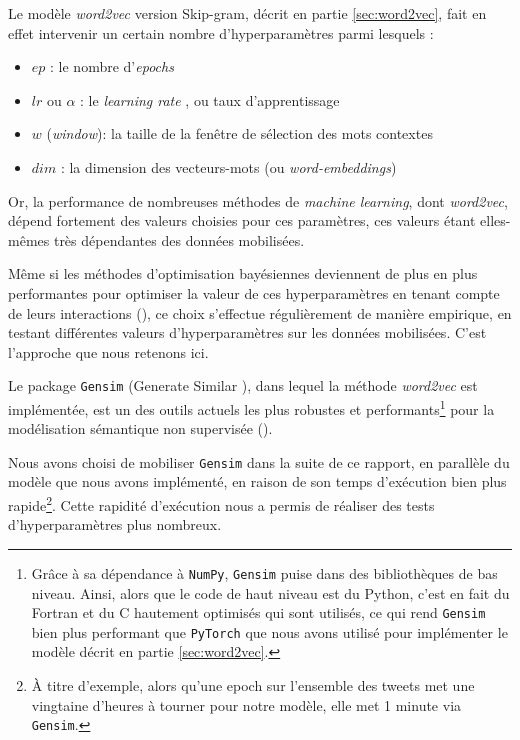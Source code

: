 \documentclass[11pt,french,french]{article}
\let\rmarkdownfootnote\footnote%
\def\footnote{\protect\rmarkdownfootnote}
\begin{document}
Le modèle \emph{word2vec} version Skip-gram, décrit en partie \ref{sec:word2vec}, fait en effet intervenir un certain nombre d'hyperparamètres parmi lesquels :

\begin{itemize}
\item $ep$ : le nombre d'\og \emph{epochs} \fg{}
\item $lr$ ou $\alpha$ : le \og \emph{learning rate} \fg{}, ou taux d'apprentissage
\item $w$ (\emph{window}): la taille de la fenêtre de sélection des mots contextes
\item $dim$ : la dimension des vecteurs-mots (ou \emph{word-embeddings})
\end{itemize}

Or, la performance de nombreuses méthodes de \emph{machine learning}, dont \emph{word2vec}, dépend fortement des valeurs choisies pour ces paramètres, ces valeurs étant elles-mêmes très dépendantes des données mobilisées.

Même si les méthodes d'optimisation bayésiennes deviennent de plus en plus performantes pour optimiser la valeur de ces hyperparamètres en tenant compte de leurs interactions (\cite{Hutter}), ce choix s'effectue régulièrement de manière empirique, en testant différentes valeurs d'hyperparamètres sur les données mobilisées.
C'est l'approche que nous retenons ici.

Le package \texttt{Gensim} (\og Generate Similar \fg{}), dans lequel la méthode \emph{word2vec} est implémentée, est un des outils actuels les plus robustes et performants\footnote{Grâce à sa dépendance à \texttt{NumPy}, \texttt{Gensim} puise dans des bibliothèques de bas niveau.
  Ainsi, alors que le code de haut niveau est du Python, c'est en fait du Fortran et du C hautement optimisés qui sont utilisés, ce qui rend \texttt{Gensim} bien plus performant que \texttt{PyTorch} que nous avons utilisé pour implémenter le modèle décrit en partie \ref{sec:word2vec}.}
pour la modélisation sémantique non supervisée (\cite{Rehurek}).

Nous avons choisi de mobiliser \texttt{Gensim} dans la suite de ce rapport, en parallèle du modèle que nous avons implémenté, en raison de son temps d'exécution bien plus rapide\footnote{À titre d'exemple, alors qu'une epoch sur l'ensemble des tweets met une vingtaine d'heures à tourner pour \og notre \fg{} modèle, elle met 1 minute via \texttt{Gensim}.}. Cette rapidité d'exécution nous a permis de réaliser des tests d'hyperparamètres plus nombreux.
\end{document}
